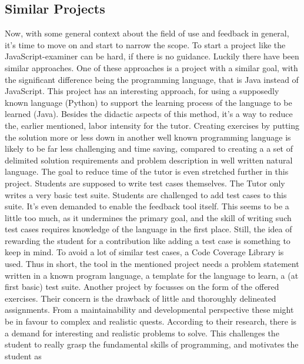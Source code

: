 \documentclass{article}
\begin{document}
\subsection{Similar Projects}
Now, with some general context about the field of use and feedback in general,
it's time to move on and
start to narrow the scope. To start a project like the JavaScript-examiner can
be hard, if there is no guidance. Luckily there have been similar approaches. 
One of these approaches is a project with a similar goal, with the significant
difference being the programming language, that is Java instead of JavaScript. 
This project  \citep{o2014java} has an interesting approach, for using a 
supposedly known language (Python) to support the learning process of the 
language to be learned (Java). %
Besides the didactic aspects of this method, it's a way to reduce the,
earlier mentioned, labor intensity for the tutor. Creating exercises by 
putting the solution more or less down in another well known programming 
language is likely
to be far less challenging and time saving, compared to creating a
a set of delimited solution requirements and problem description
in well written natural language. The goal to reduce time of the tutor is even
stretched further in this project. Students are supposed to write test cases 
themselves. The Tutor only writes a very basic test suite. Students are 
challenged to 
add test cases to this suite. It's even demanded to enable the feedback
tool itself. This seems to be a little too much, as it undermines the primary
goal, and the skill of writing such test cases requires knowledge of the
language in the first place. Still, the idea of rewarding the student for a
contribution like adding a test case is something to keep in mind. To avoid a 
lot of similar test cases, a Code Coverage Library is used. Thus in short, 
the tool in the mentioned project needs a problem statement written in a known
program language, a template for the language to learn, a (at first basic) 
test suite. \newline
Another project by 
\citep{watson2011learning}
focusses on the form of the offered exercises. Their concern is the 
drawback of little and  thoroughly delineated assignments. From a
maintainability and developmental perspective these might be in favour 
to complex and realistic quests. According to their research, there is a demand
for interesting and realistic problems to solve. This challenges the student to
really grasp the fundamental skills of programming, and motivates the student as
\end{document}
